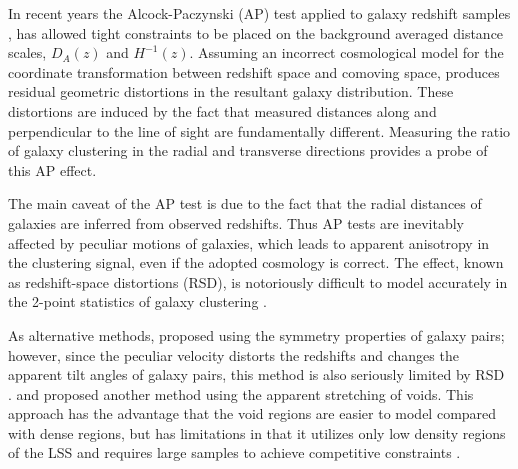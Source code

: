 \documentclass{natureprintstyle}
\let\citep\cite
\begin{document}
In recent years the Alcock-Paczynski (AP) test \citep{AP1979} applied to galaxy redshift samples \citep{Outram2004,Blake2011,Alam2016}, 
has allowed tight constraints to be placed on the background averaged distance scales, $D_A(z)$ and $H^{-1}(z)$.  
Assuming an incorrect cosmological model for the coordinate transformation between redshift space and comoving space, produces residual geometric distortions in the resultant galaxy distribution. 
These distortions are induced by the fact that measured distances along 
and perpendicular to the line of sight are fundamentally different. 
Measuring the ratio of galaxy clustering in the radial and transverse directions provides a probe of this AP effect.


The main caveat of the AP test is due to the fact that 
the radial distances of galaxies are inferred from observed redshifts.
Thus AP tests are inevitably affected by peculiar motions of galaxies,
which leads to apparent anisotropy in the clustering signal, even if the adopted cosmology is correct.
The effect, known as redshift-space distortions (RSD),
is notoriously difficult to model accurately in the 2-point statistics of galaxy clustering \citep{Ballinger1996}.

As alternative methods, \cite{Marinoni2010} proposed using the symmetry properties of galaxy pairs;
however, since the peculiar velocity distorts the redshifts and changes the apparent tilt angles of galaxy pairs,
this method is also seriously limited by RSD \citep{Jennings2011}.
\cite{Ryden1995} and \cite{LavausWandelt1995} proposed another method using the apparent stretching of voids.
This approach has the advantage that the void regions are easier to model compared with dense regions,
but has limitations in that it utilizes only low density regions of the LSS and requires large samples to achieve competitive constraints \citep{Qingqing2016}.

\end{document}
